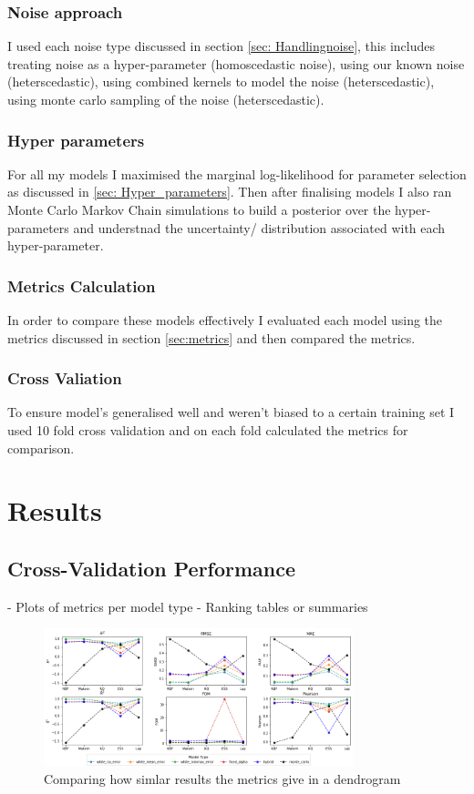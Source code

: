 \documentclass{article}
\begin{document}
\subsubsection*{Noise approach}
I used each noise type discussed in section \ref{sec: Handlingnoise}, this includes treating noise as a hyper-parameter (homoscedastic noise), 
using our known noise (heterscedastic), using combined kernels to model the noise (heterscedastic), using monte carlo sampling of the noise (heterscedastic). 

\subsubsection*{Hyper parameters}
For all my models I maximised the marginal log-likelihood for parameter selection as discussed in \ref{sec: Hyper_parameters}. Then after finalising models
I also ran Monte Carlo Markov Chain simulations to build a posterior over the hyper-parameters and understnad the uncertainty/ distribution associated with each hyper-parameter.

\subsubsection*{Metrics Calculation}
In order to compare these models effectively I evaluated each model using the metrics discussed in section \ref{sec:metrics} and then compared the metrics.

\subsubsection*{Cross Valiation}
To ensure model's generalised well and weren't biased to a certain training set I used 10 fold cross validation and on each fold calculated the metrics for comparison.


\section{Results}

\subsection{Cross-Validation Performance}
- Plots of metrics per model type
- Ranking tables or summaries

\begin{figure}[H]
    \centering
    \includegraphics[width=0.8\textwidth]{LatexPlots/CV_plots/metrics_compared.png}
    \caption{Comparing how simlar results the metrics give in a dendrogram}
    \label{fig:Dendrogram}
\end{figure}
\end{document}

